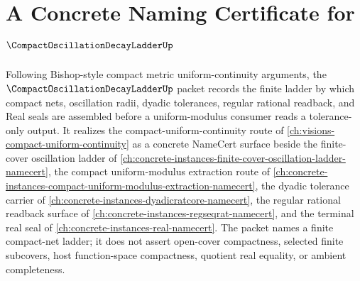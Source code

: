 \chapter{A Concrete Naming Certificate for $\CompactOscillationDecayLadderUp$}
\label{ch:concrete-instances-compact-oscillation-decay-ladder-namecert}

Following Bishop-style compact metric uniform-continuity arguments, the $\CompactOscillationDecayLadderUp$ packet records the finite ladder by which compact nets, oscillation radii, dyadic tolerances, regular rational readback, and Real seals are assembled before a uniform-modulus consumer reads a tolerance-only output. It realizes the compact-uniform-continuity route of \autoref{ch:visions-compact-uniform-continuity} as a concrete NameCert surface beside the finite-cover oscillation ladder of \autoref{ch:concrete-instances-finite-cover-oscillation-ladder-namecert}, the compact uniform-modulus extraction route of \autoref{ch:concrete-instances-compact-uniform-modulus-extraction-namecert}, the dyadic tolerance carrier of \autoref{ch:concrete-instances-dyadicratcore-namecert}, the regular rational readback surface of \autoref{ch:concrete-instances-regseqrat-namecert}, and the terminal real seal of \autoref{ch:concrete-instances-real-namecert}. The packet names a finite compact-net ladder; it does not assert open-cover compactness, selected finite subcovers, host function-space compactness, quotient real equality, or ambient completeness.

